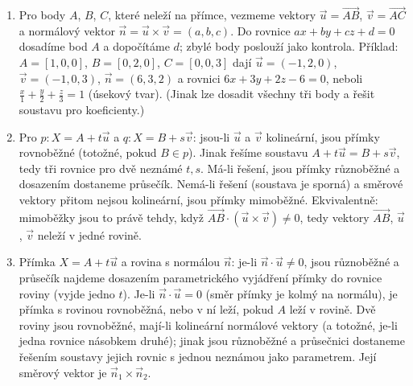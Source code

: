 \begin{enumerate}[label=\textbf{\arabic*.}, leftmargin=*, itemsep=0.8em]
  \item {}
  Pro body $A$, $B$, $C$, které neleží na přímce, vezmeme vektory $\vec{u} = \overrightarrow{AB}$, $\vec{v} = \overrightarrow{AC}$ a normálový vektor $\vec{n} = \vec{u}\times\vec{v} = (a, b, c)$. Do rovnice $ax + by + cz + d = 0$ dosadíme bod $A$ a dopočítáme $d$; zbylé body poslouží jako kontrola. Příklad: $A = [1, 0, 0]$, $B = [0, 2, 0]$, $C = [0, 0, 3]$ dají $\vec{u} = (-1, 2, 0)$, $\vec{v} = (-1, 0, 3)$, $\vec{n} = (6, 3, 2)$ a rovnici $6x + 3y + 2z - 6 = 0$, neboli $\frac{x}{1} + \frac{y}{2} + \frac{z}{3} = 1$ (úsekový tvar). (Jinak lze dosadit všechny tři body a řešit soustavu pro koeficienty.) 

  \item {}
  Pro $p: X = A + t\vec{u}$ a $q: X = B + s\vec{v}$: jsou-li $\vec{u}$ a $\vec{v}$ kolineární, jsou přímky rovnoběžné (totožné, pokud $B\in p$). Jinak řešíme soustavu $A + t\vec{u} = B + s\vec{v}$, tedy tři rovnice pro dvě neznámé $t, s$. Má-li řešení, jsou přímky různoběžné a dosazením dostaneme průsečík. Nemá-li řešení (soustava je sporná) a směrové vektory přitom nejsou kolineární, jsou přímky mimoběžné. Ekvivalentně: mimoběžky jsou to právě tehdy, když $\overrightarrow{AB}\cdot(\vec{u}\times\vec{v})\neq 0$, tedy vektory $\overrightarrow{AB}$, $\vec{u}$, $\vec{v}$ neleží v jedné rovině. 

  \item {}
  Přímka $X = A + t\vec{u}$ a rovina s normálou $\vec{n}$: je-li $\vec{n}\cdot\vec{u}\neq 0$, jsou různoběžné a průsečík najdeme dosazením parametrického vyjádření přímky do rovnice roviny (vyjde jedno $t$). Je-li $\vec{n}\cdot\vec{u} = 0$ (směr přímky je kolmý na normálu), je přímka s rovinou rovnoběžná, nebo v ní leží, pokud $A$ leží v rovině. Dvě roviny jsou rovnoběžné, mají-li kolineární normálové vektory (a totožné, je-li jedna rovnice násobkem druhé); jinak jsou různoběžné a průsečnici dostaneme řešením soustavy jejich rovnic s jednou neznámou jako parametrem. Její směrový vektor je $\vec{n}_1\times\vec{n}_2$.


\end{enumerate}
